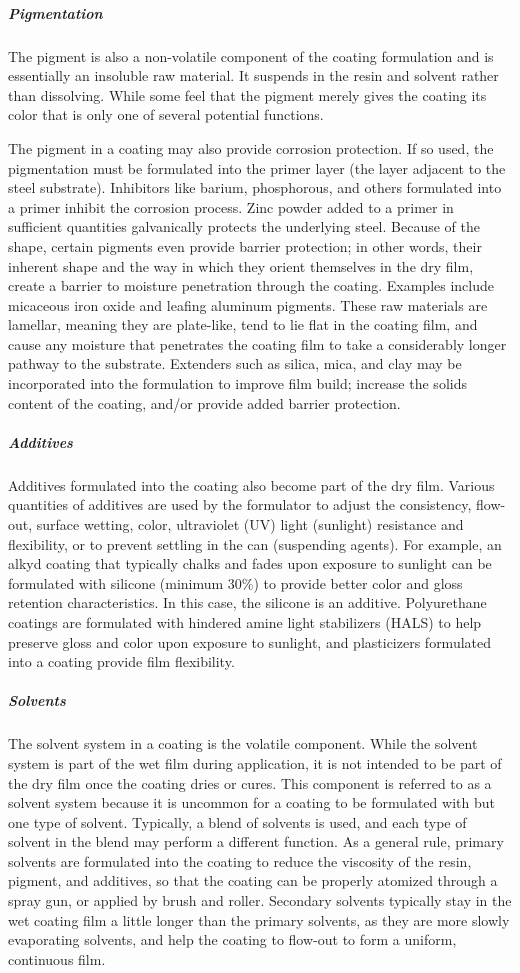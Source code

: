 \subparagraph*{Pigmentation}
The pigment is also a non-volatile component of the coating formulation and is essentially an insoluble raw
material. It suspends in the resin and solvent rather than dissolving. While some feel that the pigment merely gives
the coating its color that is only one of several potential functions.

The pigment in a coating may also provide corrosion protection. If so used, the pigmentation must be formulated
into the primer layer (the layer adjacent to the steel substrate). Inhibitors like barium, phosphorous, and others
formulated into a primer inhibit the corrosion process. Zinc powder added to a primer in sufficient quantities
galvanically protects the underlying steel. Because of the shape, certain pigments even provide barrier protection; in
other words, their inherent shape and the way in which they orient themselves in the dry film, create a barrier to
moisture penetration through the coating. Examples include micaceous iron oxide and leafing aluminum pigments.
These raw materials are lamellar, meaning they are plate-like, tend to lie flat in the coating film, and cause any
moisture that penetrates the coating film to take a considerably longer pathway to the substrate. Extenders such as
silica, mica, and clay may be incorporated into the formulation to improve film build; increase the solids content of
the coating, and/or provide added barrier protection.

\subparagraph*{Additives}
Additives formulated into the coating also become part of the dry film. Various quantities of additives are used
by the formulator to adjust the consistency, flow-out, surface wetting, color, ultraviolet (UV) light (sunlight)
resistance and flexibility, or to prevent settling in the can (suspending agents). For example, an alkyd coating that
typically chalks and fades upon exposure to sunlight can be formulated with silicone (minimum 30\%) to provide
better color and gloss retention characteristics. In this case, the silicone is an additive. Polyurethane coatings are formulated with hindered amine light stabilizers (HALS) to help preserve gloss and color upon exposure to sunlight,
and plasticizers formulated into a coating provide film flexibility.

\subparagraph*{Solvents}
The solvent system in a coating is the volatile component. While the solvent system is part of the wet film during
application, it is not intended to be part of the dry film once the coating dries or cures. This component is referred to
as a solvent system because it is uncommon for a coating to be formulated with but one type of solvent. Typically, a
blend of solvents is used, and each type of solvent in the blend may perform a different function. As a general rule,
primary solvents are formulated into the coating to reduce the viscosity of the resin, pigment, and additives, so that
the coating can be properly atomized through a spray gun, or applied by brush and roller. Secondary solvents
typically stay in the wet coating film a little longer than the primary solvents, as they are more slowly evaporating
solvents, and help the coating to flow-out to form a uniform, continuous film.

